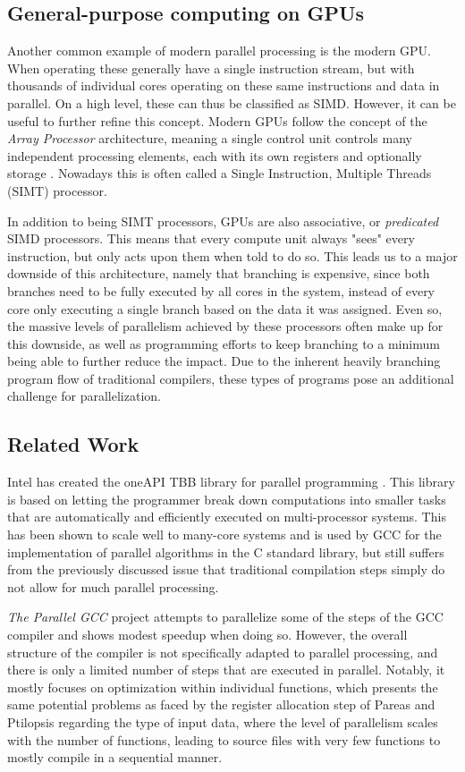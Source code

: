 \documentclass[11pt,dvipsnames]{article}
\newcommand{\Rplus}{\protect\hspace{-.1em}\protect\raisebox{.35ex}{\smaller{\smaller\textbf{+}}}}
\newcommand{\Cpp}{\mbox{C\Rplus\Rplus}\xspace}
\begin{document}
\subsection{General-purpose computing on GPUs}
Another common example of modern parallel processing is the modern GPU. When operating these generally have a single instruction stream, but with thousands of individual cores operating on these same instructions and data in parallel. On a high level, these can thus be classified as SIMD. However, it can be useful to further refine this concept. Modern GPUs follow the concept of the \textit{Array Processor} architecture, meaning a single control unit controls many independent processing elements, each with its own registers and optionally storage \cite{flynn2}. Nowadays this is often called a Single Instruction, Multiple Threads (SIMT) processor.

In addition to being SIMT processors, GPUs are also associative, or \textit{predicated} SIMD processors. This means that every compute unit always "sees" every instruction, but only acts upon them when told to do so. This leads us to a major downside of this architecture, namely that branching is expensive, since both branches need to be fully executed by all cores in the system, instead of every core only executing a single branch based on the data it was assigned. Even so, the massive levels of parallelism achieved by these processors often make up for this downside, as well as programming efforts to keep branching to a minimum being able to further reduce the impact. Due to the inherent heavily branching program flow of traditional compilers, these types of programs pose an additional challenge for parallelization.

\subsection{Related Work}
Intel has created the oneAPI TBB library for parallel programming \cite{oneapi}. This library is based on letting the programmer break down computations into smaller tasks that are automatically and efficiently executed on multi-processor systems. This has been shown to scale well to many-core systems and is used by GCC for the implementation of parallel algorithms in the \Cpp standard library, but still suffers from the previously discussed issue that traditional compilation steps simply do not allow for much parallel processing.

\textit{The Parallel GCC} project attempts to parallelize some of the steps of the GCC compiler and shows modest speedup when doing so. However, the overall structure of the compiler is not specifically adapted to parallel processing, and there is only a limited number of steps that are executed in parallel. Notably, it mostly focuses on optimization within individual functions, which presents the same potential problems as faced by the register allocation step of Pareas and Ptilopsis regarding the type of input data, where the level of parallelism scales with the number of functions, leading to source files with very few functions to mostly compile in a sequential manner.
\end{document}
